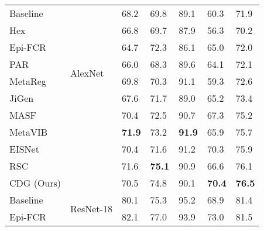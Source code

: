 \begin{table*}[htb]
\begin{center}
\begin{tabularx}{0.9\textwidth}{p{}<{\centering}|p{}<{\centering}|p{}<{\centering}|p{}<{\centering}|p{}<{\centering}|p{}<{\centering}|X<{\centering}}
      Baseline                         & \multirow{8}{*}{AlexNet
      }
                                       & 68.2                      & 69.8          & 89.1          & 60.3          & 71.9                                   \\
      Hex \citep{wang2019learning1}     &                           & 66.8          & 69.7          & 87.9          & 56.3          & 70.2                   \\
      Epi-FCR \citep{li2019episodic}    &                           & 64.7          & 72.3          & 86.1          & 65.0          & 72.0                   \\
      PAR \citep{wang2019learning}      &                           & 66.0          & 68.3          & 89.6          & 64.1          & 72.1                   \\
      MetaReg \citep{balaji2018metareg} &                           & 69.8          & 70.3          & 91.1          & 59.3          & 72.6                   \\
      JiGen \citep{li2019episodic}      &                           & 67.6          & 71.7          & 89.0          & 65.2          & 73.4                   \\
      MASF \citep{dou2019domain}        &                           & 70.4          & 72.5          & 90.7          & 67.3          & 75.2                   \\
      MetaVIB \citep{du2020learning}    &                           & \textbf{71.9} & 73.2          & \textbf{91.9} & 65.9          & 75.7                   \\
      EISNet \citep{wang2020learning}   &                           & 70.4          & 71.6          & 91.2          & 70.3          & 75.9                   \\
      RSC \citep{huangRSC2020}          &                           & 71.6          & \textbf{75.1} & 90.9          & 66.6          & 76.1                   \\
      CDG (Ours)                       &                           & 70.5          & 74.8          & 90.1          & \textbf{70.4} & \textbf{76.5}          \\
      \midrule[0.4pt]
      Baseline                         & \multirow{8}{*}{ResNet-18}
                                       & 80.1                      & 75.3          & 95.2          & 68.9          & 81.4                                   \\
      Epi-FCR \citep{li2019episodic}    &                           & 82.1          & 77.0          & 93.9          & 73.0          & 81.5                   \\

\end{tabularx}
\end{center}
\end{table*}
